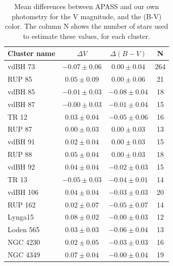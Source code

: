 \documentclass[draft]{aa}
\begin{document}
\begin{table}[ht]
    \centering
    \begin{tabular}{lccc}
    \hline
    Cluster name & $\Delta V$ & $\Delta (B-V)$ & N \\
    \hline \hline
    vdBH 73 & $-0.07\pm0.06$ & $0.00\pm0.04$ & 264\\
    RUP 85 & $0.05\pm0.09$ & $0.00\pm0.06$ & 21\\
    vdBH 85 & $-0.01\pm0.03$ & $-0.08\pm0.04$ & 18\\
    vdBH 87 & $-0.00\pm0.03$ & $-0.01\pm0.04$ & 15\\
    TR 12 & $0.03\pm0.04$ & $-0.05\pm0.06$ & 16\\
    RUP 87 & $0.00\pm0.03$ & $0.00\pm0.03$ & 13\\
    vdBH 91 & $0.02\pm0.04$ & $0.00\pm0.03$ & 15\\
    RUP 88 & $0.05\pm0.04$ & $0.00\pm0.03$ & 18\\
    vdBH 92 & $0.04\pm0.04$ & $-0.02\pm0.03$ & 15\\
    TR 13 & $-0.05\pm0.03$ & $-0.04\pm0.01$ & 14\\
    vdBH 106 & $0.04\pm0.04$ & $-0.03\pm0.03$ & 20\\
    RUP 162 & $0.02\pm0.07$ & $-0.05\pm0.07$ & 14\\
    Lynga15 & $0.08\pm0.02$ & $-0.00\pm0.03$ & 12\\
    Loden 565 & $0.03\pm0.03$ & $-0.06\pm0.04$ & 13\\
    NGC 4230 & $0.02\pm0.05$ & $-0.03\pm0.03$ & 16\\
    NGC 4349 & $0.07\pm0.04$ & $-0.00\pm0.04$ & 19\\
    \hline
    \end{tabular}
    \caption{Mean differences between APASS and our own photometry for the
    V magnitude, and the (B-V) color. The column N shows the number of
    stars used to estimate these values, for each cluster.}
    \label{tab:apass_diffs}
\end{table}
\end{document}

